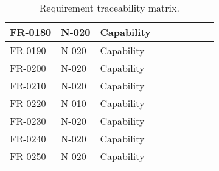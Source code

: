 \begin{sidewaystable}
\begin{table}[H]
\begin{tabular}{|p{2cm}|p{2cm}|p{3cm}|p{2cm}|p{2cm}|p{2cm}|p{2cm}|p{2cm}|p{2cm}|}
 FR-0180 & N-020 & Capability & & & & & &\\ \hline
 FR-0190 & N-020 & Capability & & & & & &\\ \hline
 FR-0200 & N-020 & Capability & & & & & &\\ \hline
 FR-0210 & N-020 & Capability & & & & & &\\ \hline
 FR-0220 & N-010 & Capability & & & & & &\\ \hline
 FR-0230 & N-020 & Capability & & & & & &\\ \hline
 FR-0240 & N-020 & Capability & & & & & &\\ \hline
 FR-0250 & N-020 & Capability & & & & & &\\ \hline
 
\end{tabular}	
\caption{Requirement traceability matrix.}
\end{table}

\end{sidewaystable}

